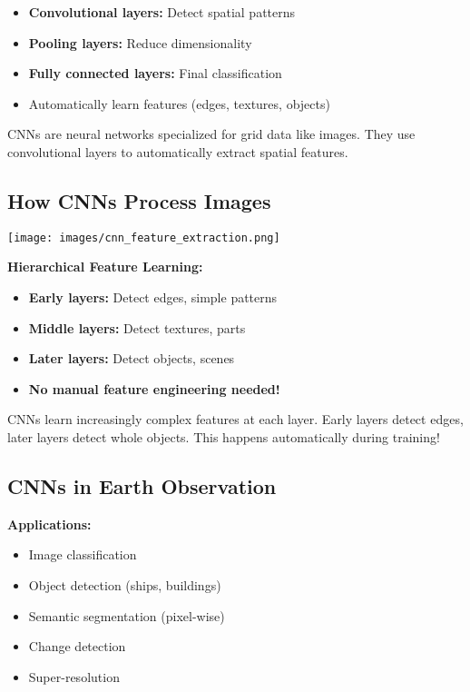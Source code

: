 \documentclass[
  letterpaper,
  DIV=11,
  numbers=noendperiod]{scrartcl}
\providecommand{\tightlist}{%
  \setlength{\itemsep}{0pt}\setlength{\parskip}{0pt}}
\begin{document}
\begin{itemize}
\tightlist
\item
  \textbf{Convolutional layers:} Detect spatial patterns
\item
  \textbf{Pooling layers:} Reduce dimensionality
\item
  \textbf{Fully connected layers:} Final classification
\item
  Automatically learn features (edges, textures, objects)
\end{itemize}

CNNs are neural networks specialized for grid data like images. They use
convolutional layers to automatically extract spatial features.

\subsection{How CNNs Process Images}\label{how-cnns-process-images}

\begin{center}
\texttt{[image: images/cnn\_feature\_extraction.png]}
\end{center}

\textbf{Hierarchical Feature Learning:}

\begin{itemize}
\tightlist
\item
  \textbf{Early layers:} Detect edges, simple patterns
\item
  \textbf{Middle layers:} Detect textures, parts
\item
  \textbf{Later layers:} Detect objects, scenes
\item
  \textbf{No manual feature engineering needed!}
\end{itemize}

CNNs learn increasingly complex features at each layer. Early layers
detect edges, later layers detect whole objects. This happens
automatically during training!

\subsection{CNNs in Earth Observation}\label{cnns-in-earth-observation}

\textbf{Applications:}

\begin{itemize}
\tightlist
\item
  Image classification
\item
  Object detection (ships, buildings)
\item
  Semantic segmentation (pixel-wise)
\item
  Change detection
\item
  Super-resolution
\end{itemize}
\end{document}
